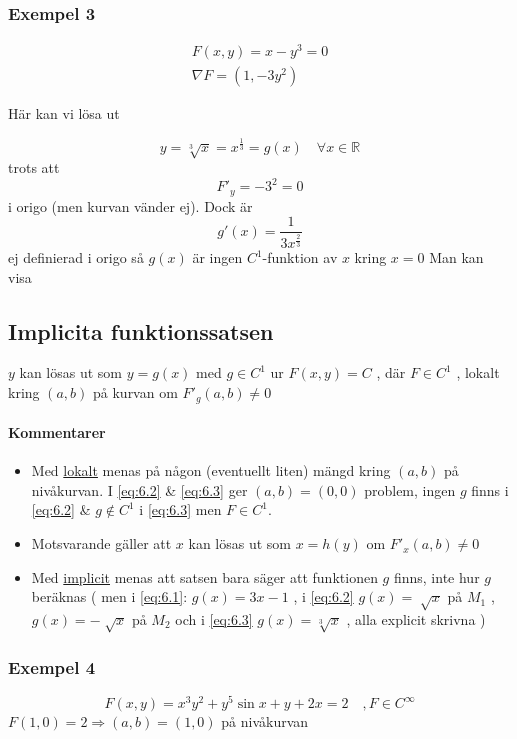 \documentclass{article}
\let\oldsqrt\sqrt
\renewcommand*{\sqrt}[2][\ ]{\oldsqrt[#1]{#2} }
\begin{document}
\subsubsection{Exempel 3}
\begin{equation} \label{eq:6.3}
\begin{split}
	F(x,y) = x-y^3 = 0 \\
	\nabla F = (1,-3y^2)
\end{split}
\end{equation}

Här kan vi lösa ut 

\[y = \sqrt[3]{x} = x^\frac{1}{3} = g(x) \quad \forall x \in \mathbb{R}\]
trots att 
\[F'_y = -3^2 = 0\]
i origo (men kurvan vänder ej). Dock är
\[g'(x) = \frac{1}{3x^\frac{2}{3}}\]
ej definierad i origo så \(g(x)\) är ingen \(C^1\)-funktion av \(x\) kring \(x = 0\) \newline
Man kan visa

\subsection{Implicita funktionssatsen}
\(y\) kan lösas ut som \(y = g(x)\) med \(g \in C^1\) ur \(F(x,y) = C\) , där \(F \in C^1\) , lokalt kring \((a,b)\) på kurvan om \(F'_g(a,b) \neq 0\)

\paragraph{Kommentarer}
\begin{itemize}
\item Med \underline{lokalt} menas på någon (eventuellt liten) mängd kring \((a,b)\) på nivåkurvan. I \eqref{eq:6.2} \& \eqref{eq:6.3} ger \((a,b) = (0,0)\) problem, 
ingen \(g\) finns i \eqref{eq:6.2} \& \(g \notin C^1\) i \eqref{eq:6.3} men \(F \in C^1\).
\item Motsvarande gäller att \(x\) kan lösas ut som \(x = h(y)\) om \(F'_x(a,b) \neq 0\)
\item Med \underline{implicit} menas att satsen bara säger att funktionen \(g\) finns, inte hur \(g\) beräknas \newline
\Bigg(
men i \eqref{eq:6.1}: \(g(x) = 3x-1\) , i \eqref{eq:6.2} \(g(x) = \sqrt{x}\) på \(M_1\) , \(g(x) = -\sqrt{x}\) på \(M_2\) och i \eqref{eq:6.3} \(g(x) = \sqrt[3]{x}\) , alla explicit skrivna
\Bigg)
\end{itemize}

\newpage
\subsubsection{Exempel 4}
\begin{equation} \label{eq:6.4}
	F(x,y) = x^3y^2 + y^5\sin{x} + y + 2x = 2 \quad , F \in C^\infty
\end{equation}
\(F(1,0) = 2 \Rightarrow (a,b) = (1,0)\) på nivåkurvan
\end{document}
